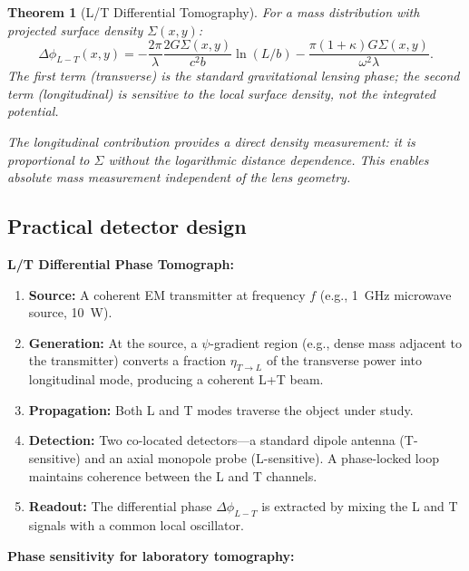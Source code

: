 \documentclass[11pt]{article}
\newtheorem{theorem}{Theorem}
\begin{document}
\begin{theorem}[L/T Differential Tomography]
\label{thm:tomography}
For a mass distribution with projected surface density $\Sigma(x,y)$:
\begin{equation}
\boxed{\Delta\phi_{L-T}(x,y) = -\frac{2\pi}{\lambda}
\frac{2G\Sigma(x,y)}{c^2 b}\ln(L/b)
- \frac{\pi(1+\kappa)G\Sigma(x,y)}{\omega^2\lambda}.}
\end{equation}
The first term (transverse) is the standard gravitational lensing
phase; the second term (longitudinal) is sensitive to the
\textit{local} surface density, not the integrated potential.

The longitudinal contribution provides a \textit{direct density
measurement}: it is proportional to $\Sigma$ without the logarithmic
distance dependence. This enables absolute mass measurement
independent of the lens geometry.
\end{theorem}

\subsection{Practical detector design}

\textbf{L/T Differential Phase Tomograph:}

\begin{enumerate}
\item \textbf{Source:} A coherent EM transmitter at frequency $f$
(e.g., 1~GHz microwave source, 10~W).

\item \textbf{Generation:} At the source, a $\psi$-gradient region
(e.g., dense mass adjacent to the transmitter) converts a fraction
$\eta_{T\to L}$ of the transverse power into longitudinal mode,
producing a coherent L+T beam.

\item \textbf{Propagation:} Both L and T modes traverse the object
under study.

\item \textbf{Detection:} Two co-located detectors---a standard
dipole antenna (T-sensitive) and an axial monopole probe
(L-sensitive). A phase-locked loop maintains coherence between
the L and T channels.

\item \textbf{Readout:} The differential phase
$\Delta\phi_{L-T}$ is extracted by mixing the L and T signals
with a common local oscillator.
\end{enumerate}

\textbf{Phase sensitivity for laboratory tomography:}
\end{document}
